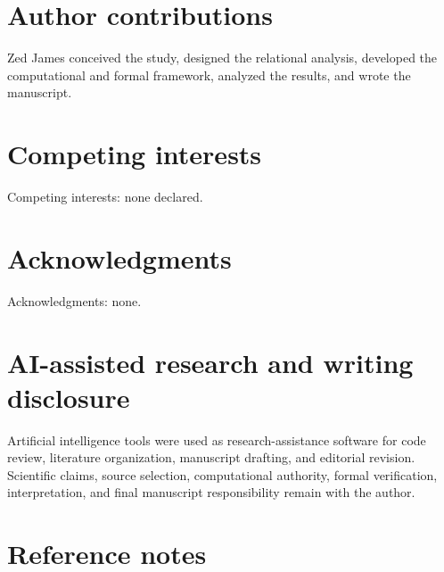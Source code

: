 \documentclass[11pt]{article}
\begin{document}
\section{Author contributions}

Zed James conceived the study, designed the relational analysis, developed the computational and formal framework, analyzed the results, and wrote the manuscript.

\section{Competing interests}

Competing interests: none declared.

\section{Acknowledgments}

Acknowledgments: none.

\section{AI-assisted research and writing disclosure}

Artificial intelligence tools were used as research-assistance software for code review, literature organization, manuscript drafting, and editorial revision. Scientific claims, source selection, computational authority, formal verification, interpretation, and final manuscript responsibility remain with the author.
\newpage
\appendix

\section{Reference notes}
\label{app:references}
\end{document}
